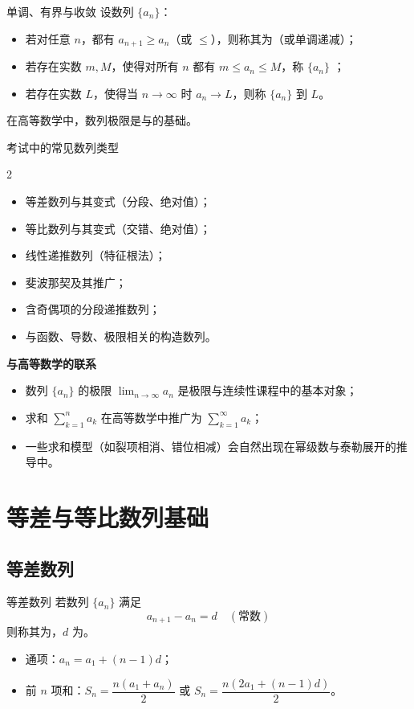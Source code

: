 \documentclass[a4paper,11pt]{ctexart}
\newcommand{\SeqMiniHeading}[1]{%
  \par\smallskip
  \noindent\textbf{#1}\par\smallskip
}
\begin{document}
\begin{definitionbox}{单调、有界与收敛}
  设数列 $\{a_n\}$：
  \begin{itemize}
    \item 若对任意 $n$，都有 $a_{n+1}\ge a_n$（或 $\le$），则称其为（或单调递减）；
    \item 若存在实数 $m,M$，使得对所有 $n$ 都有 $m\le a_n\le M$，称 $\{a_n\}$ ；
    \item 若存在实数 $L$，使得当 $n\to\infty$ 时 $a_n\to L$，则称 $\{a_n\}$ 到 $L$。
  \end{itemize}
  在高等数学中，数列极限是与的基础。
\end{definitionbox}

\begin{summarybox}{考试中的常见数列类型}
  \begin{multicols}{2}
    \begin{itemize}
      \item 等差数列与其变式（分段、绝对值）；
      \item 等比数列与其变式（交错、绝对值）；
      \item 线性递推数列（特征根法）；
      \item 斐波那契及其推广；
      \item 含奇偶项的分段递推数列；
      \item 与函数、导数、极限相关的构造数列。
    \end{itemize}
  \end{multicols}
\end{summarybox}

\SeqMiniHeading{与高等数学的联系}
\begin{itemize}
  \item 数列 $\{a_n\}$ 的极限 $\lim_{n\to\infty} a_n$ 是极限与连续性课程中的基本对象；
  \item 求和 $\sum_{k=1}^n a_k$ 在高等数学中推广为 $\sum_{k=1}^{\infty} a_k$；
  \item 一些求和模型（如裂项相消、错位相减）会自然出现在幂级数与泰勒展开的推导中。
\end{itemize}

\clearpage
\section{等差与等比数列基础}

\subsection{等差数列}
\begin{definitionbox}{等差数列}
  若数列 $\{a_n\}$ 满足
  \[
    a_{n+1}-a_n = d\quad(\text{常数})
  \]
  则称其为，$d$ 为。
  \begin{itemize}
    \item 通项：$a_n = a_1 + (n-1)d$；
    \item 前 $n$ 项和：$S_n = \dfrac{n(a_1+a_n)}{2}$ 或 $S_n = \dfrac{n(2a_1+(n-1)d)}{2}$。
  \end{itemize}
\end{definitionbox}
\end{document}
